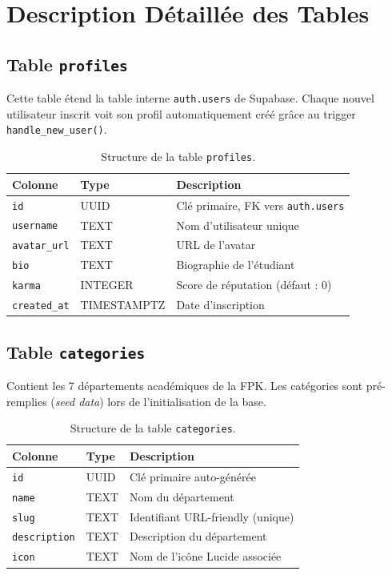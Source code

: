 \documentclass[12pt, a4paper]{report}
\begin{document}
\section{Description Détaillée des Tables}

\subsection{Table \texttt{profiles}}

Cette table étend la table interne \texttt{auth.users} de Supabase. Chaque nouvel utilisateur inscrit voit son profil automatiquement créé grâce au trigger \texttt{handle\_new\_user()}.

\begin{table}[H]
\centering
\renewcommand{\arraystretch}{1.3}
\begin{tabularx}{\textwidth}{l l X}
\toprule
\textbf{Colonne} & \textbf{Type} & \textbf{Description} \\
\midrule
\texttt{id} & UUID & Clé primaire, FK vers \texttt{auth.users} \\
\texttt{username} & TEXT & Nom d'utilisateur unique \\
\texttt{avatar\_url} & TEXT & URL de l'avatar \\
\texttt{bio} & TEXT & Biographie de l'étudiant \\
\texttt{karma} & INTEGER & Score de réputation (défaut : 0) \\
\texttt{created\_at} & TIMESTAMPTZ & Date d'inscription \\
\bottomrule
\end{tabularx}
\caption{Structure de la table \texttt{profiles}.}
\end{table}

\subsection{Table \texttt{categories}}

Contient les 7 départements académiques de la FPK. Les catégories sont pré-remplies (\textit{seed data}) lors de l'initialisation de la base.

\begin{table}[H]
\centering
\renewcommand{\arraystretch}{1.3}
\begin{tabularx}{\textwidth}{l l X}
\toprule
\textbf{Colonne} & \textbf{Type} & \textbf{Description} \\
\midrule
\texttt{id} & UUID & Clé primaire auto-générée \\
\texttt{name} & TEXT & Nom du département \\
\texttt{slug} & TEXT & Identifiant URL-friendly (unique) \\
\texttt{description} & TEXT & Description du département \\
\texttt{icon} & TEXT & Nom de l'icône Lucide associée \\
\bottomrule
\end{tabularx}
\caption{Structure de la table \texttt{categories}.}
\end{table}
\end{document}
